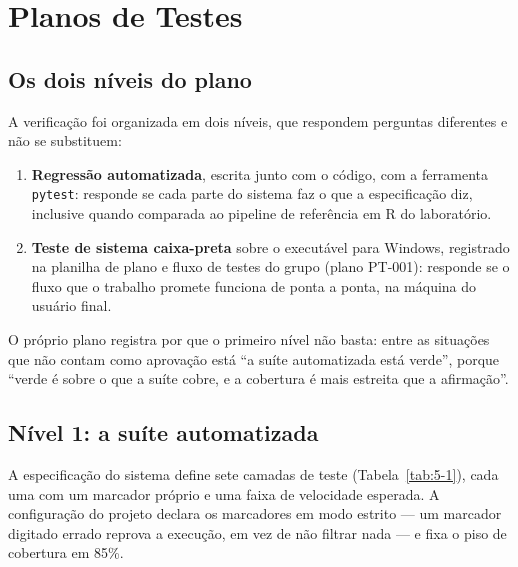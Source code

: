 
\section{Planos de Testes}\label{sec:5-1}

\subsection{Os dois níveis do plano}\label{sec:5-1-1}

A verificação foi organizada em dois níveis, que respondem perguntas diferentes e não se substituem:

\begin{enumerate}
\item \textbf{Regressão automatizada}, escrita junto com o código, com a ferramenta \texttt{pytest}: responde se cada parte do sistema faz o que a especificação diz, inclusive quando comparada ao pipeline de referência em R do laboratório.
\item \textbf{Teste de sistema caixa-preta} sobre o executável para Windows, registrado na planilha de plano e fluxo de testes do grupo (plano PT-001): responde se o fluxo que o trabalho promete funciona de ponta a ponta, na máquina do usuário final.
\end{enumerate}

O próprio plano registra por que o primeiro nível não basta: entre as situações que não contam como aprovação está ``a suíte automatizada está verde'', porque ``verde é sobre o que a suíte cobre, e a cobertura é mais estreita que a afirmação''.


\subsection{Nível 1: a suíte automatizada}\label{sec:5-1-2}

A especificação do sistema define sete camadas de teste (Tabela~\ref{tab:5-1}), cada uma com um marcador próprio e uma faixa de velocidade esperada. A configuração do projeto declara os marcadores em modo estrito --- um marcador digitado errado reprova a execução, em vez de não filtrar nada --- e fixa o piso de cobertura em 85\%.

